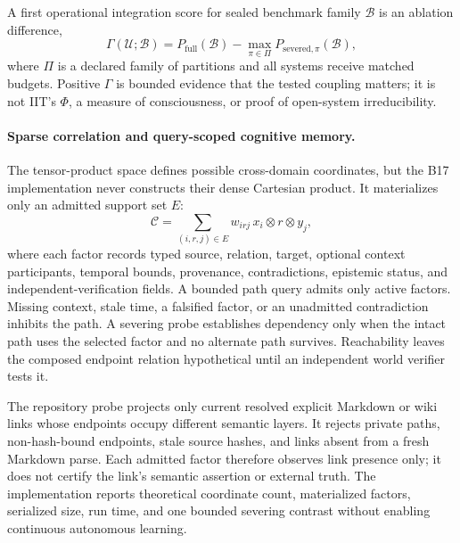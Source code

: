 \documentclass[10pt,twocolumn]{article}
\theoremstyle{definition}
\theoremstyle{plain}
\theoremstyle{remark}
\begin{document}
A first operational integration score for sealed benchmark family $\mathcal B$ is an ablation difference,
\begin{equation}
\Gamma(\mathcal U;\mathcal B)=P_{\mathrm{full}}(\mathcal B)-\max_{\pi\in\Pi}P_{\mathrm{severed},\pi}(\mathcal B),
\label{eq:unity-ablation}
\end{equation}
where $\Pi$ is a declared family of partitions and all systems receive matched budgets.  Positive $\Gamma$ is bounded evidence that the tested coupling matters; it is not IIT's $\Phi$, a measure of consciousness, or proof of open-system irreducibility.

\paragraph{Sparse correlation and query-scoped cognitive memory.}
\label{sec:sparse-correlation-memory}
The tensor-product space defines possible cross-domain coordinates, but the B17 implementation never constructs their dense Cartesian product.  It materializes only an admitted support set $E$:
\begin{equation}
\mathcal C=\sum_{(i,r,j)\in E}w_{irj}\,x_i\otimes r\otimes y_j,
\label{eq:sparse-correlation-support}
\end{equation}
where each factor records typed source, relation, target, optional context participants, temporal bounds, provenance, contradictions, epistemic status, and independent-verification fields.  A bounded path query admits only active factors.  Missing context, stale time, a falsified factor, or an unadmitted contradiction inhibits the path.  A severing probe establishes dependency only when the intact path uses the selected factor and no alternate path survives.  Reachability leaves the composed endpoint relation hypothetical until an independent world verifier tests it.

The repository probe projects only current resolved explicit Markdown or wiki links whose endpoints occupy different semantic layers.  It rejects private paths, non-hash-bound endpoints, stale source hashes, and links absent from a fresh Markdown parse.  Each admitted factor therefore observes link presence only; it does not certify the link's semantic assertion or external truth.  The implementation reports theoretical coordinate count, materialized factors, serialized size, run time, and one bounded severing contrast without enabling continuous autonomous learning.
\end{document}
